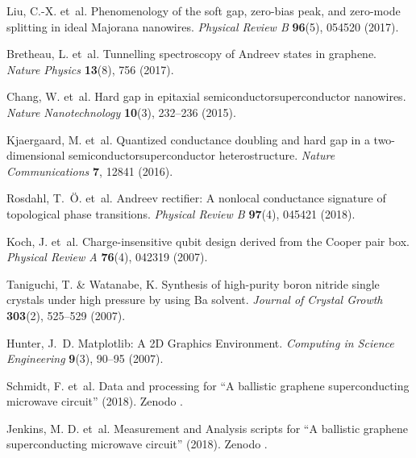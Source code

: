 \documentclass[preprint,
  onecolumn,
  notitlepage,
  amsmath,amssymb,
  aip,
  apl,
]{revtex4-1}
\begin{document}
\begin{thebibliography}{10}
	Liu, C.-X. et~al.
	\newblock Phenomenology of the soft gap, zero-bias peak, and zero-mode
	splitting in ideal {{Majorana}} nanowires.
	\newblock \emph{Physical Review B} \textbf{96}(5), 054520 (2017).
	
	Bretheau, L. et~al.
	\newblock Tunnelling spectroscopy of {{Andreev}} states in graphene.
	\newblock \emph{Nature Physics} \textbf{13}(8), 756 (2017).
	
	Chang, W. et~al.
	\newblock Hard gap in epitaxial semiconductor\textendash{}superconductor
	nanowires.
	\newblock \emph{Nature Nanotechnology} \textbf{10}(3), 232--236 (2015).
	
	Kjaergaard, M. et~al.
	\newblock Quantized conductance doubling and hard gap in a two-dimensional
	semiconductor\textendash{}superconductor heterostructure.
	\newblock \emph{Nature Communications} \textbf{7}, 12841 (2016).
	
	Rosdahl, T.~{\"O}. et~al.
	\newblock Andreev rectifier: {{A}} nonlocal conductance signature of
	topological phase transitions.
	\newblock \emph{Physical Review B} \textbf{97}(4), 045421 (2018).
	
	Koch, J. et~al.
	\newblock Charge-insensitive qubit design derived from the {{Cooper}} pair box.
	\newblock \emph{Physical Review A} \textbf{76}(4), 042319 (2007).
	
	Taniguchi, T. \& Watanabe, K.
	\newblock Synthesis of high-purity boron nitride single crystals under high
	pressure by using {{Ba}} solvent.
	\newblock \emph{Journal of Crystal Growth} \textbf{303}(2), 525--529 (2007).
	
	Hunter, J.~D.
	\newblock Matplotlib: {{A 2D Graphics Environment}}.
	\newblock \emph{Computing in Science Engineering} \textbf{9}(3), 90--95 (2007).
	
	Schmidt, F. et~al.
	\newblock Data and processing for ``A ballistic graphene superconducting microwave circuit'' (2018).
	\newblock Zenodo
	\newblock {}.
	
	Jenkins, M. D. et~al.
	\newblock Measurement and Analysis scripts for ``A ballistic graphene superconducting microwave circuit'' (2018).
	\newblock Zenodo
	\newblock {}.

	
\end{thebibliography}
\end{document}
